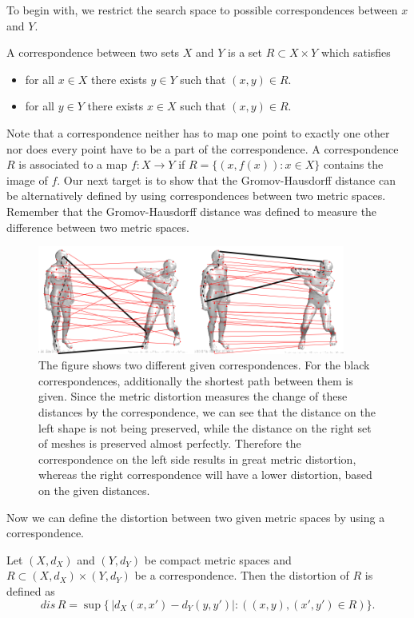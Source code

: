 To begin with, we restrict the search space to possible correspondences between $x$ and $Y$.
\begin{mydef}[correspondence]
	A correspondence between two sets $X$ and $Y$ is a set $R \subset X \times Y$ which satisfies
	\begin{itemize}
		\item for all $x \in X$ there exists $y\in Y$ such that $(x,y) \in R$.
		\item for all $y \in Y$ there exists $x\in X$ such that $(x,y) \in R$.
	\end{itemize}
\end{mydef}
Note that a correspondence neither has to map one point to exactly one other nor does every point have to be a part of the correspondence.
A correspondence $R$ is associated to a map $f: X \rightarrow Y$ if $R = \{(x,f(x)) :x \in X\}$ contains the image of $f$.
Our next target is to show that the Gromov-Hausdorff distance can be alternatively defined by using correspondences between two metric spaces.
Remember that the Gromov-Hausdorff distance was defined to measure the difference between two metric spaces.
\begin{figure}[h]
	\centering
	\includegraphics[width = 0.9\textwidth]{pictures/metric_distortion}
	\caption{The figure shows two different given correspondences.
		For the black correspondences, additionally the shortest path between them is given.
		Since the metric distortion measures the change of these distances by the correspondence, we can see that the distance on the left shape is not being preserved, while the distance on the right set of meshes is preserved almost perfectly.
		Therefore the correspondence on the left side results in great metric distortion, whereas the right correspondence will have a lower distortion, based on the given distances.}
	\label{fig:metric_distortion}
\end{figure}
Now we can define the distortion between two given metric spaces by using a correspondence.
\begin{mydef}
	Let $(X,d_X)$ and $(Y,d_Y)$ be compact metric spaces and $R \subset (X,d_X) \times (Y,d_Y)$ be a correspondence.
	Then the distortion of $R$ is defined as
	\begin{equation}
		dis\,R = \sup\{\,|d_X(x,x') - d_Y(y,y')|: \left( (x,y), (x',y') \in R \right)\}.
	\end{equation}
\end{mydef}
